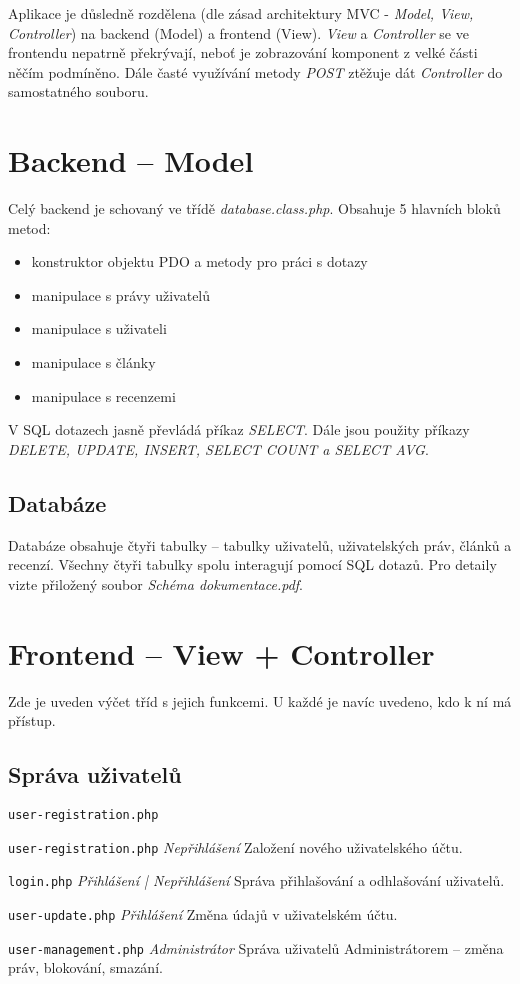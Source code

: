 Aplikace je důsledně rozdělena (dle zásad architektury MVC - \emph{Model, View, Controller}) na backend (Model) a frontend (View). \emph{View} a \emph{Controller} se ve frontendu nepatrně překrývají, neboť je zobrazování komponent z velké části něčím podmíněno. Dále časté využívání metody \emph{POST} ztěžuje dát \emph{Controller} do samostatného souboru.

\section{Backend -- Model}
Celý backend je schovaný ve třídě \emph{database.class.php}. Obsahuje 5 hlavních bloků metod:

\begin{itemize}
\item{konstruktor objektu PDO a metody pro práci s dotazy}
\item{manipulace s právy uživatelů}
\item{manipulace s uživateli}
\item{manipulace s články}
\item{manipulace s recenzemi}
\end{itemize}

\par \noindent
V SQL dotazech jasně převládá příkaz \emph{SELECT}. Dále jsou použity příkazy \emph{DELETE, UPDATE, INSERT, SELECT COUNT a SELECT AVG}.

\subsection{Databáze}
Databáze obsahuje čtyři tabulky -- tabulky uživatelů, uživatelských práv, článků a recenzí. Všechny čtyři tabulky spolu interagují pomocí SQL dotazů. Pro detaily vizte přiložený soubor \emph{Schéma dokumentace.pdf}.

\section{Frontend -- View + Controller}
Zde je uveden výčet tříd s jejich funkcemi. U každé je navíc uvedeno, kdo k ní má přístup.
\subsection{Správa uživatelů}
\begin{labeling}{\texttt{user-registration.php}}
\item [\texttt{user-registration.php}] \emph{Nepřihlášení} Založení nového uživatelského účtu.
\item [\texttt{login.php}] \emph{Přihlášení | Nepřihlášení} Správa přihlašování a odhlašování uživatelů.
\item [\texttt{user-update.php}] \emph{Přihlášení} Změna údajů v uživatelském účtu.
\item [\texttt{user-management.php}] \emph{Administrátor} Správa uživatelů Administrátorem -- změna práv, blokování, smazání.
\end{labeling}


